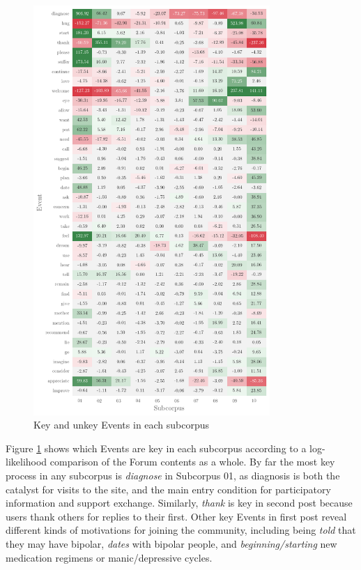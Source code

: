 \documentclass{article}
\begin{document}
{%
\begin{figure}
    \includegraphics[width=0.80\textwidth]{images/event-heatmap.png}
    \hspace{1.6cm}
    \caption{Key and unkey Events in each subcorpus}
    \label{fig:event_heatmap}
 \end{figure}

Figure \ref{fig:event_heatmap} shows which Events are key in each subcorpus according to a log-likelihood comparison of the Forum contents as a whole. By far the most key process in any subcorpus is \emph{diagnose} in Subcorpus 01, as diagnosis is both the catalyst for visits to the site, and the main entry condition for participatory information and support exchange. Similarly, \emph{thank} is key in second post because users thank others for replies to their first. Other key Events in first post reveal different kinds of motivations for joining the community, including being \emph{told} that they may have bipolar, \emph{dates} with bipolar people, and \emph{beginning\slash starting} new medication regimens or manic\slash depressive cycles.

}
\end{document}
